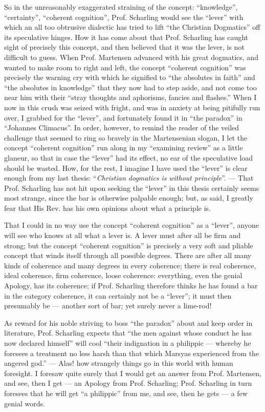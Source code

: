 \documentclass[12pt,a4paper,openany]{book}
\newcommand{\opage}[1]{\marginnote{\footnotesize\textit{[#1]}}}
\begin{document}
So in the unreasonably exaggerated straining of the concept:
``knowledge'', ``certainty'', ``coherent cognition'',
Prof. Scharling would see the ``lever'' with which
an all too obtrusive dialectic has tried to lift
``the Christian Dogmatics'' off its speculative hinges.
How it has come about that Prof. Scharling has caught sight
of precisely this concept, and then believed that it was the lever,
is not difficult to guess. When Prof. Martensen
advanced with his great dogmatics, and wanted to make
room to right and left, the concept ``coherent
cognition'' was precisely the warning cry with which he signified to ``the absolutes in faith'' and ``the absolutes in knowledge''
that they now had to step aside, and not come too
near him with their ``stray thoughts and aphorisms, fancies
and flashes.'' When I now in this crush was seized
with fright, and was in anxiety at being pitifully
run over, I grabbed for the ``lever'', and fortunately found it
in ``the paradox'' in ``Johannes Climacus''. In order,
however, to remind the reader of the veiled challenge
that seemed to ring so bravely in the Martensenian slogan,
I let the concept
``coherent cognition'' run along in my ``examining review'' as a little
glaneur, so that in case the ``lever'' had
its effect, no ear of the speculative load should be wasted.
How, for the rest, I imagine I
have used the ``lever'' is clear enough from my last
thesis: ``\emph{Christian dogmatics is}
\setcounter{footnote}{0}%
\opage{23}\emph{without principle}''. --- That Prof. Scharling has not hit upon
seeking the ``lever'' in this thesis certainly seems most
strange, since the bar is otherwise palpable enough; but, as
said, I greatly fear that His Rev. has his own opinions
about what a principle is.

That I could in no way use the concept
``coherent cognition'' as a ``lever'',
anyone will see who knows at all what a lever is.
A lever must after all be firm and strong; but the concept ``coherent
cognition'' is precisely a very soft and pliable
concept that winds itself through all possible degrees. There
are after all many kinds of coherence and many degrees
in every coherence; there is real coherence,
ideal coherence, firm coherence, loose coherence:
everything, even the genial Apology, has its coherence; if Prof. Scharling therefore thinks he has found a bar in the category
coherence, it can
certainly not be a ``lever''; it must then presumably be --- another sort of bar; yet surely never a lime-rod!

As reward for his noble striving to boss ``the paradox'' about
and keep order in literature, Prof. Scharling expects
that ``the men against whose conduct he has now declared
himself'' will cool ``their indignation in a philippic ---
whereby he foresees a treatment no less harsh
than that which Marsyas experienced from the angered god.'' ---
Alas! how strangely things go in this world
with human foresight. I foresaw quite surely
that I would get an answer from Prof. Martensen,
and see, then I get --- an Apology from Prof. Scharling;
Prof. Scharling in turn foresees that he will
get ``a philippic'' from me, and see, then he gets
--- a few genial words.
\end{document}
